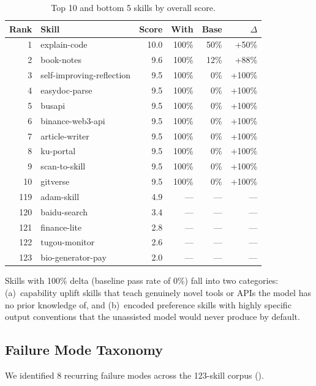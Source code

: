 \documentclass[11pt,a4paper]{article}
\begin{document}
\begin{table}[h]
\centering
\caption{Top 10 and bottom 5 skills by overall score.}
\label{tab:topbottom}
\begin{tabular}{rlrrrr}
\toprule
\textbf{Rank} & \textbf{Skill} & \textbf{Score} & \textbf{With} & \textbf{Base} & \textbf{$\Delta$} \\
\midrule
1 & explain-code & 10.0 & 100\% & 50\% & +50\% \\
2 & book-notes & 9.6 & 100\% & 12\% & +88\% \\
3 & self-improving-reflection & 9.5 & 100\% & 0\% & +100\% \\
4 & easydoc-parse & 9.5 & 100\% & 0\% & +100\% \\
5 & busapi & 9.5 & 100\% & 0\% & +100\% \\
6 & binance-web3-api & 9.5 & 100\% & 0\% & +100\% \\
7 & article-writer & 9.5 & 100\% & 0\% & +100\% \\
8 & ku-portal & 9.5 & 100\% & 0\% & +100\% \\
9 & scan-to-skill & 9.5 & 100\% & 0\% & +100\% \\
10 & gitverse & 9.5 & 100\% & 0\% & +100\% \\
\midrule
119 & adam-skill & 4.9 & --- & --- & --- \\
120 & baidu-search & 3.4 & --- & --- & --- \\
121 & finance-lite & 2.8 & --- & --- & --- \\
122 & tugou-monitor & 2.6 & --- & --- & --- \\
123 & bio-generator-pay & 2.0 & --- & --- & --- \\
\bottomrule
\end{tabular}
\end{table}

Skills with 100\% delta (baseline pass rate of 0\%) fall into two categories: (a)~capability uplift skills that teach genuinely novel tools or APIs the model has no prior knowledge of, and (b)~encoded preference skills with highly specific output conventions that the unassisted model would never produce by default.

\subsection{Failure Mode Taxonomy}
\label{sec:failures}

We identified 8 recurring failure modes across the 123-skill corpus ().
\end{document}
